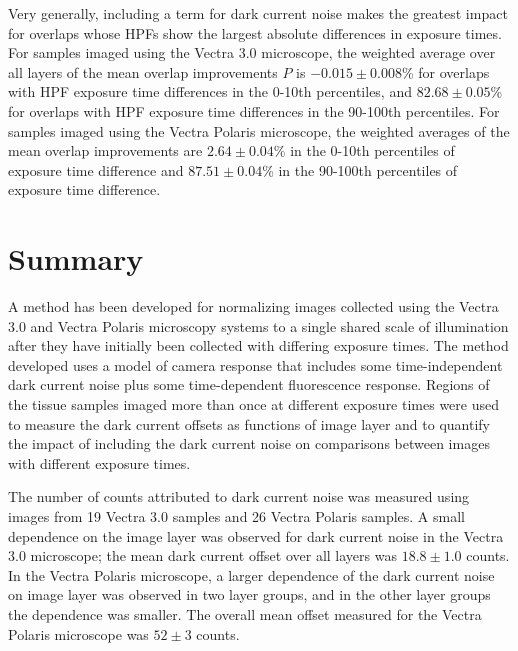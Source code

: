 \documentclass[letterpaper,11pt]{article}
\begin{document}
Very generally, including a term for dark current noise makes the greatest impact for overlaps whose HPFs show the largest absolute differences in exposure times. For samples imaged using the Vectra 3.0 microscope, the weighted average over all layers of the mean overlap improvements $P$ is $-0.015\pm0.008$\% for overlaps with HPF exposure time differences in the 0-10th percentiles, and $82.68\pm0.05$\% for overlaps with HPF exposure time differences in the 90-100th percentiles. For samples imaged using the Vectra Polaris microscope, the weighted averages of the mean overlap improvements are $2.64\pm0.04$\% in the 0-10th percentiles of exposure time difference and $87.51\pm0.04$\% in the 90-100th percentiles of exposure time difference.

\clearpage

\section{Summary}
\label{sec:summary}

A method has been developed for normalizing images collected using the Vectra 3.0 and Vectra Polaris microscopy systems to a single shared scale of illumination after they have initially been collected with differing exposure times. The method developed uses a model of camera response that includes some time-independent dark current noise plus some time-dependent fluorescence response. Regions of the tissue samples imaged more than once at different exposure times were used to measure the dark current offsets as functions of image layer and to quantify the impact of including the dark current noise on comparisons between images with different exposure times. 

The number of counts attributed to dark current noise was measured using images from 19 Vectra 3.0 samples and 26 Vectra Polaris samples. A small dependence on the image layer was observed for dark current noise in the Vectra 3.0 microscope; the mean dark current offset over all layers was $18.8\pm1.0$ counts. In the Vectra Polaris microscope, a larger dependence of the dark current noise on image layer was observed in two layer groups, and in the other layer groups the dependence was smaller. The overall mean offset measured for the Vectra Polaris microscope was $52\pm3$ counts.
\end{document}
